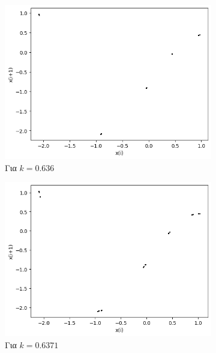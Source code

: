 \begin{figure}[ht]
	\centering
	\begin{subfigure}[b]{0.4\textwidth}
		\centering
		\includegraphics[width=\textwidth]{LateX images/graphs q21/g4}
		\caption{Για $k=0.636$}
		\label{f:k104}
	\end{subfigure}
	\hfill
	\begin{subfigure}[b]{0.4\textwidth}
		\centering
		\includegraphics[width=\textwidth]{LateX images/graphs q21/g5}
		\caption{Για $k=0.6371$}
		\label{f:k105}
	\end{subfigure}
	\hfill
	\begin{subfigure}[b]{0.4\textwidth}
		\centering

\end{subfigure}
\end{figure}
